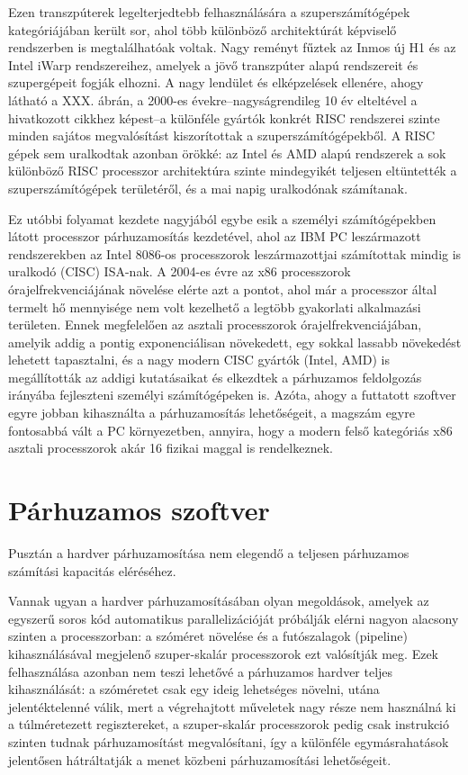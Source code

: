 Ezen transzpúterek legelterjedtebb felhasználására a szuperszámítógépek kategóriájában került sor, ahol több különböző architektúrát képviselő rendszerben is megtalálhatóak voltak.
Nagy reményt fűztek az Inmos új H1 és az Intel iWarp rendszereihez, amelyek a jövő transzpúter alapú rendszereit és szupergépeit fogják elhozni. \cite{hey_supercomputing_1990} A nagy lendület és elképzelések ellenére, ahogy látható a XXX. ábrán, a 2000-es évekre--nagyságrendileg 10 év elteltével a hivatkozott cikkhez képest--a különféle gyártók konkrét RISC rendszerei szinte minden sajátos megvalósítást kiszorítottak a szuperszámítógépekből.
A RISC gépek sem uralkodtak azonban örökké: az Intel és AMD alapú rendszerek a sok különböző RISC processzor architektúra szinte mindegyikét teljesen eltüntették a szuperszámítógépek területéről, és a mai napig uralkodónak számítanak.



Ez utóbbi folyamat kezdete nagyjából egybe esik a személyi számítógépekben látott processzor párhuzamosítás kezdetével, ahol az IBM PC leszármazott rendszerekben az Intel 8086-os processzorok leszármazottjai számítottak mindig is uralkodó (CISC) ISA-nak.
A 2004-es évre az x86 processzorok órajelfrekvenciájának növelése elérte azt a pontot, ahol már a processzor által termelt hő mennyisége nem volt kezelhető a legtöbb gyakorlati alkalmazási területen. \cite{fuller_future_2011}
Ennek megfelelően az asztali processzorok órajelfrekvenciájában, amelyik addig a pontig exponenciálisan növekedett, \cite[S.1 ábra]{fuller_future_2011} egy sokkal lassabb növekedést lehetett tapasztalni, és a nagy modern CISC gyártók (Intel, AMD) is megállították az addigi kutatásaikat \cite{smith_intel_2004} és elkezdtek a párhuzamos feldolgozás irányába fejleszteni személyi számítógépeken is.
Azóta, ahogy a futtatott szoftver egyre jobban kihasználta a párhuzamosítás lehetőségeit, a magszám egyre fontosabbá vált a PC környezetben, annyira, hogy a modern felső kategóriás x86 asztali processzorok akár 16 fizikai maggal is rendelkeznek.

\section{Párhuzamos szoftver}\label{sec:par-sw}

Pusztán a hardver párhuzamosítása nem elegendő a teljesen párhuzamos számítási kapacitás eléréséhez.

Vannak ugyan a hardver párhuzamosításában olyan megoldások, amelyek az egyszerű soros kód automatikus parallelizációját próbálják elérni nagyon alacsony szinten a processzorban: a szóméret növelése és a futószalagok (\foreignlanguage{english}{pipeline}) kihasználásával megjelenő szuper-skalár processzorok ezt valósítják meg.
Ezek felhasználása azonban nem teszi lehetővé a párhuzamos hardver teljes kihasználását: a szóméretet csak egy ideig lehetséges növelni, utána jelentéktelenné válik, mert a végrehajtott műveletek nagy része nem használná ki a túlméretezett regisztereket, a szuper-skalár processzorok pedig csak instrukció szinten tudnak párhuzamosítást megvalósítani, így a különféle egymásrahatások jelentősen hátráltatják a menet közbeni párhuzamosítási lehetőségeit.

